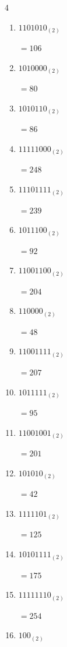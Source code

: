 \begin{multicols}{4}
\begin{enumerate}
        $=60$

  \item $1101010_{(2)}$

        $=106$

  \item $1010000_{(2)}$

        $=80$

  \item $1010110_{(2)}$

        $=86$

  \item $11111000_{(2)}$

        $=248$

  \item $11101111_{(2)}$

        $=239$

  \item $1011100_{(2)}$

        $=92$

\columnbreak %

  \item $11001100_{(2)}$

        $=204$

  \item $110000_{(2)}$

        $=48$

  \item $11001111_{(2)}$

        $=207$

  \item $1011111_{(2)}$

        $=95$

  \item $11001001_{(2)}$

        $=201$

  \item $101010_{(2)}$

        $=42$

  \item $1111101_{(2)}$

        $=125$

  \item $10101111_{(2)}$

        $=175$

  \item $11111110_{(2)}$

        $=254$

  \item $100_{(2)}$


\end{enumerate}
\end{multicols}
